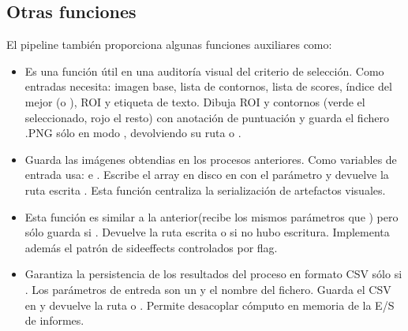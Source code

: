 \documentclass[a4paper,10pt,spanish]{jupyterBook}
\begin{document}
\subsection{Otras funciones}
\label{\detokenize{content/01/Modulo-3:otras-funciones}}
\sphinxAtStartPar
El pipeline también proporciona algunas funciones auxiliares como:
\begin{itemize}
\item {}
\sphinxAtStartPar
{} Es una función útil en una auditoría visual del criterio de selección. Como entradas necesita: imagen base, lista de contornos, lista de scores, índice del mejor (o ), ROI  y etiqueta de texto. Dibuja ROI y contornos (verde el seleccionado, rojo el resto) con anotación de puntuación y guarda el fichero .PNG sólo en modo , devolviendo su ruta o .

\item {}
\sphinxAtStartPar
{} Guarda las imágenes obtendias en los procesos anteriores. Como variables de entrada usa:  e . Escribe el array en disco en con el parámetro  y devuelve la ruta escrita . Esta función centraliza la serialización de artefactos visuales.

\item {}
\sphinxAtStartPar
{} Esta función es similar a la anterior(recibe los mismos parámetros que ) pero sólo guarda si . Devuelve la ruta escrita o  si no hubo escritura. Implementa además el patrón de side\sphinxhyphen{}effects controlados por flag.

\item {}
\sphinxAtStartPar
{} Garantiza la persistencia de los resultados del proceso en formato CSV sólo si . Los parámetros de entreda son un  y el nombre  del fichero. Guarda el CSV en  y devuelve la ruta o . Permite desacoplar cómputo en memoria de la E/S de informes.


\end{itemize}
\end{document}
